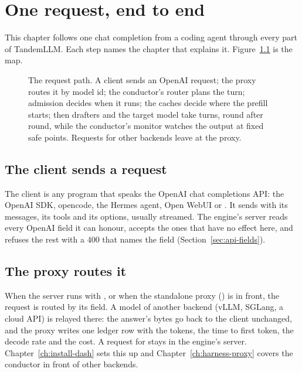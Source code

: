 \chapter{One request, end to end}\label{ch:tour}

This chapter follows one chat completion from a coding agent through every part of TandemLLM. Each step names the chapter that explains it. Figure~\ref{fig:request-path} is the map.

\begin{figure}[htbp]
\centering

\caption{The request path. A client sends an OpenAI request; the proxy routes it by model id; the conductor's router plans the turn; admission decides when it runs; the caches decide where the prefill starts; then drafters and the target model take turns, round after round, while the conductor's monitor watches the output at fixed safe points. Requests for other backends leave at the proxy.}\label{fig:request-path}
\end{figure}

\section{The client sends a request}

The client is any program that speaks the OpenAI chat completions API: the OpenAI SDK, opencode, the Hermes agent, Open WebUI or . It sends  with its messages, its tools and its options, usually streamed. The engine's server reads every OpenAI field it can honour, accepts the ones that have no effect here, and refuses the rest with a 400 that names the field (Section~\ref{sec:api-fields}).

\section{The proxy routes it}

When the server runs with , or when the standalone proxy () is in front, the request is routed by its  field. A model of another backend (vLLM, SGLang, a cloud API) is relayed there: the answer's bytes go back to the client unchanged, and the proxy writes one ledger row with the tokens, the time to first token, the decode rate and the cost. A request for  stays in the engine's server. Chapter~\ref{ch:install-dash} sets this up and Chapter~\ref{ch:harness-proxy} covers the conductor in front of other backends.

